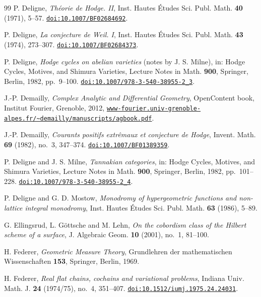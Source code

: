 \begin{thebibliography}{99}
P. Deligne,
\emph{Th\'eorie de Hodge. II},
Inst. Hautes \'Etudes Sci. Publ. Math. \textbf{40} (1971), 5--57.
\href{https://doi.org/10.1007/BF02684692}{\texttt{doi:10.1007/BF02684692}}.

P. Deligne,
\emph{La conjecture de Weil. I},
Inst. Hautes \'Etudes Sci. Publ. Math. \textbf{43} (1974), 273--307.
\href{https://doi.org/10.1007/BF02684373}{\texttt{doi:10.1007/BF02684373}}.

P. Deligne,
\emph{Hodge cycles on abelian varieties} (notes by J. S. Milne),
in: Hodge Cycles, Motives, and Shimura Varieties,
Lecture Notes in Math. \textbf{900}, Springer, Berlin, 1982, pp.~9--100.
\href{https://doi.org/10.1007/978-3-540-38955-2_3}%
{\texttt{doi:10.1007/978-3-540-38955-2\_3}}.

J.-P. Demailly,
\emph{Complex Analytic and Differential Geometry},
OpenContent book, Institut Fourier, Grenoble, 2012,
\href{https://www-fourier.univ-grenoble-alpes.fr/~demailly/manuscripts/agbook.pdf}{\texttt{www-fourier.univ-grenoble-alpes.fr/\~{}demailly/manuscripts/agbook.pdf}}.

J.-P. Demailly,
\emph{Courants positifs extr\^emaux et conjecture de Hodge},
Invent. Math. \textbf{69} (1982), no.~3, 347--374.
\href{https://doi.org/10.1007/BF01389359}{\texttt{doi:10.1007/BF01389359}}.

P. Deligne and J. S. Milne,
\emph{Tannakian categories},
in: Hodge Cycles, Motives, and Shimura Varieties,
Lecture Notes in Math. \textbf{900}, Springer, Berlin, 1982, pp.~101--228.
\href{https://doi.org/10.1007/978-3-540-38955-2_4}%
{\texttt{doi:10.1007/978-3-540-38955-2\_4}}.

P. Deligne and G. D. Mostow,
\emph{Monodromy of hypergeometric functions and non-lattice integral
monodromy},
Inst. Hautes \'Etudes Sci. Publ. Math. \textbf{63} (1986), 5--89.

G. Ellingsrud, L. G\"ottsche and M. Lehn,
\emph{On the cobordism class of the Hilbert scheme of a surface},
J. Algebraic Geom. \textbf{10} (2001), no.~1, 81--100.

H. Federer,
\emph{Geometric Measure Theory},
Grundlehren der mathematischen Wissenschaften \textbf{153},
Springer, Berlin, 1969.

H. Federer,
\emph{Real flat chains, cochains and variational problems},
Indiana Univ. Math. J. \textbf{24} (1974/75), no.~4, 351--407.
\href{https://doi.org/10.1512/iumj.1975.24.24031}{\texttt{doi:10.1512/iumj.1975.24.24031}}.


\end{thebibliography}
